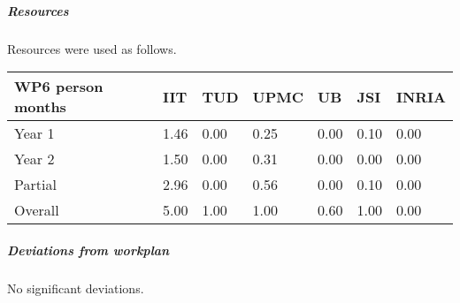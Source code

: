

\subparagraph{Resources}

Resources were used as follows.

\begin{center}
\begin{tabular}{|C{1.5cm}|C{1.5cm}|C{1.5cm}|C{2cm}|C{2cm}|C{2cm}|C{2cm}|}
\hline
\footnotesize \textbf{WP6 person months}& \footnotesize \textbf{IIT}&\footnotesize \textbf{TUD}&\footnotesize \textbf{UPMC}& \footnotesize \textbf{UB} &\footnotesize \textbf{JSI} & \footnotesize \textbf{INRIA} \\ \hline
\footnotesize Year 1 &  1.46 & 0.00 & 0.25 & 0.00 & 0.10 & 0.00    \\  \hline
\footnotesize Year 2 &  1.50 & 0.00 & 0.31 & 0.00 & 0.00 & 0.00     \\  \hline
\footnotesize Partial &  2.96 & 0.00 & 0.56 & 0.00 & 0.10 & 0.00 \\ \hline \hline
\footnotesize Overall &  5.00 & 1.00 & 1.00 & 0.60 & 1.00 & 0.00 \\ \hline
\end{tabular}
\end{center}

\subparagraph{Deviations from workplan} 
No significant deviations. 